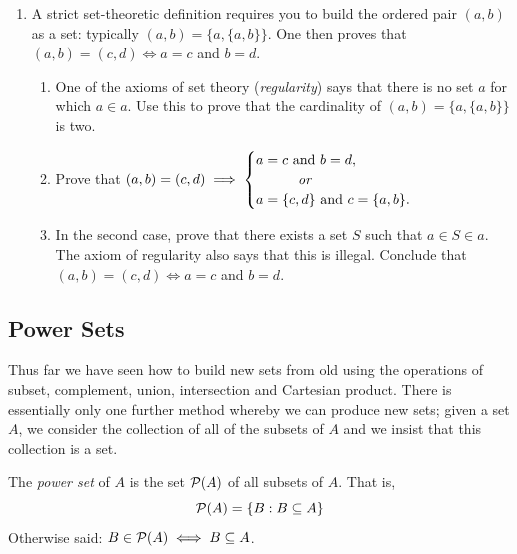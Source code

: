 \begin{exercises}{}{}
\begin{enumerate}
	\item A strict set-theoretic definition requires you to build the ordered pair $(a,b)$ as a set: typically $(a,b)=\{a,\{a,b\}\}$. One then proves that $(a,b)=(c,d)\iff a=c$ and $b=d$.
	\begin{enumerate}
	  \item One of the axioms of set theory (\emph{regularity}) says that there is no set $a$ for which $a\in a$. Use this to prove that the cardinality of $(a,b)=\{a,\{a,b\}\}$ is two.
	  \item Prove that $(a,b)=(c,d)\implies\begin{cases}
	  a=c\text{ and }b=d,\\
	  \qquad\quad\text{\emph{or}}\\
	  a=\{c,d\}\text{ and }c=\{a,b\}.
	  \end{cases}$
	  \item In the second case, prove that there exists a set $S$ such that $a\in S\in a$. The axiom of regularity also says that this is illegal. Conclude that $(a,b)=(c,d)\iff a=c$ and $b=d$.
	\end{enumerate}
\end{enumerate}

\end{exercises}


\clearpage


\subsection{Power Sets}

Thus far we have seen how to build new sets from old using the operations of subset, complement, union, intersection and Cartesian product. There is essentially only one further method whereby we can produce new sets; given a set $A$, we consider the collection of all of the subsets of $A$ and we insist that this collection is a set.

\begin{defn}{}{}
	The \emph{power set} of $A$ is the set $\mathcal{P}(A)$ of all subsets of $A$. That is,
	\[
		\mathcal{P}(A)=\{B:B\subseteq A\}
	\]
	Otherwise said: $B\in\mathcal{P}(A)\iff B\subseteq A$.
\end{defn}

